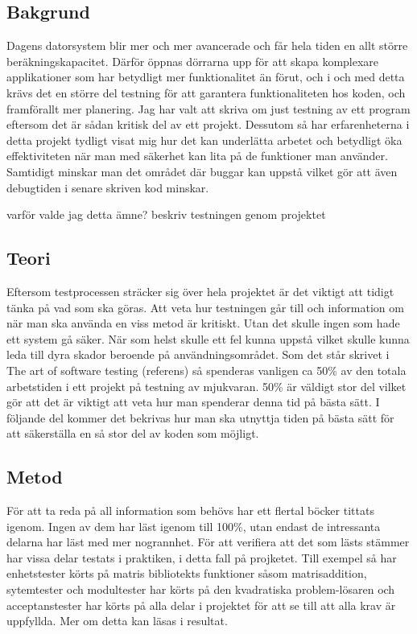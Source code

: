 	\subsection{Bakgrund}
	
	Dagens datorsystem blir mer och mer avancerade och får hela tiden en allt större beräkningskapacitet. Därför öppnas dörrarna upp för att skapa komplexare applikationer som har betydligt mer funktionalitet än förut, och i och med detta krävs det en större del testning för att garantera funktionaliteten hos koden, och framförallt mer planering. \newline
	Jag har valt att skriva om just testning av ett program eftersom det är sådan kritisk del av ett projekt. Dessutom så har erfarenheterna i detta projekt tydligt visat mig hur det kan underlätta arbetet och betydligt öka effektiviteten när man med säkerhet kan lita på de funktioner man använder. Samtidigt minskar man det området där buggar kan uppstå vilket gör att även debugtiden i senare skriven kod minskar. \newline
	
	varför valde jag detta ämne?
	beskriv testningen genom projektet
	
	
	\subsection{Teori}
	Eftersom testprocessen sträcker sig över hela projektet är det viktigt att tidigt tänka på vad som ska göras. Att veta hur testningen går till och information om när man ska använda en viss metod är kritiskt. Utan det skulle ingen som hade ett system gå säker. När som helst skulle ett fel kunna uppstå vilket skulle kunna leda till dyra skador beroende på användningsområdet. \newline
	Som det står skrivet i The art of software testing (referens) så spenderas vanligen ca 50\% av den totala arbetstiden i ett projekt på testning av mjukvaran. 50\% är väldigt stor del vilket gör att det är viktigt att veta hur man spenderar denna tid på bästa sätt. I följande del kommer det bekrivas hur man ska utnyttja tiden på bästa sätt för att säkerställa en så stor del av koden som möjligt. \newline
	
	\subsection{Metod}
	För att ta reda på all information som behövs har ett flertal böcker tittats igenom. Ingen av dem har läst igenom till 100\%, utan endast de intressanta delarna har läst med mer nogrannhet. För att verifiera att det som lästs stämmer har vissa delar testats i praktiken, i detta fall på projketet. Till exempel så har enhetstester körts på matris bibliotekts funktioner såsom matrisaddition, sytemtester och modultester har körts på den kvadratiska problem-lösaren och acceptanstester har körts på alla delar i projektet för att se till att alla krav är uppfyllda. Mer om detta kan läsas i resultat. \newline
	
